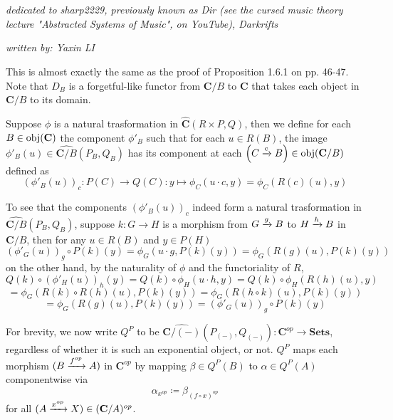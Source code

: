 \section{}
\emph{dedicated to sharp2229, previously known as Dir (see the cursed music theory lecture "Abstracted Systems of Music", on YouTube), Darkrifts}

\emph{written by: Yaxin LI}

This is almost exactly the same as the proof of Proposition 1.6.1 on pp. 46-47. Note that $D_B$ is a forgetful-like functor from $\mathbf C/B$ to $\mathbf C$ that takes each object in $\mathbf C/B$ to its domain.

Suppose $\phi$ is a natural trasformation in $\widehat{\mathbf{C}}(R\times P,Q)$, then we define for each $B\in\operatorname{\operatorname{obj}}(\mathbf C)$ the component $\phi'_B$ such that for each $u\in R(B)$, the image $\phi'_B(u)\in\widehat{\mathbf{C}/B}(P_B,Q_B)$ has its component at each $\left(C\xrightarrow{c}B\right)\in\operatorname{\operatorname{obj}}(\mathbf C/B)$ defined as
\[(\phi'_B(u))_c:P(C)\to Q(C):y\mapsto\phi_C(u\cdot c,y)=\phi_C(R(c)(u),y)\]

To see that the components $(\phi'_B(u))_c$ indeed form a natural trasformation in $\widehat{\mathbf{C}/B}(P_B,Q_B)$, suppose $k:G\to H$ is a morphism from $G\xrightarrow{g}B$ to $H\xrightarrow{h}B$ in $\mathbf{C}/B$, then for any $u\in R(B)$ and $y\in P(H)$
\[(\phi'_G(u))_g\circ P(k)(y)=\phi_G(u\cdot g,P(k)(y))=\phi_G(R(g)(u),P(k)(y))\]
on the other hand, by the naturality of $\phi$ and the functoriality of $R$,
\[Q(k)\circ(\phi'_H(u))_h(y)=Q(k)\circ\phi_H(u\cdot h,y)=Q(k)\circ\phi_H(R(h)(u),y)\]
\[=\phi_G(R(k)\circ R(h)(u),P(k)(y))=\phi_G(R(h\circ k)(u),P(k)(y))\]
\[=\phi_G(R(g)(u),P(k)(y))=(\phi'_G(u))_g\circ P(k)(y)\]

For brevity, we now write $Q^P$ to be $\widehat{\mathbf{C}/(-)}(P_{(-)},Q_{(-)}):\mathbf{C}^{op}\to\mathbf{Sets}$, regardless of whether it is such an exponential object, or not. $Q^P$ maps each morphism $(B\xrightarrow{f^{op}}A)$ in $\mathbf{C}^{op}$ by mapping $\beta\in Q^P(B)$ to $\alpha\in Q^P(A)$ componentwise via
\[\alpha_{x^{op}}\coloneqq\beta_{(f\circ x)^{op}}\]
for all $(A\xrightarrow{x^{op}}X)\in(\mathbf{C}/A)^{op}$.

